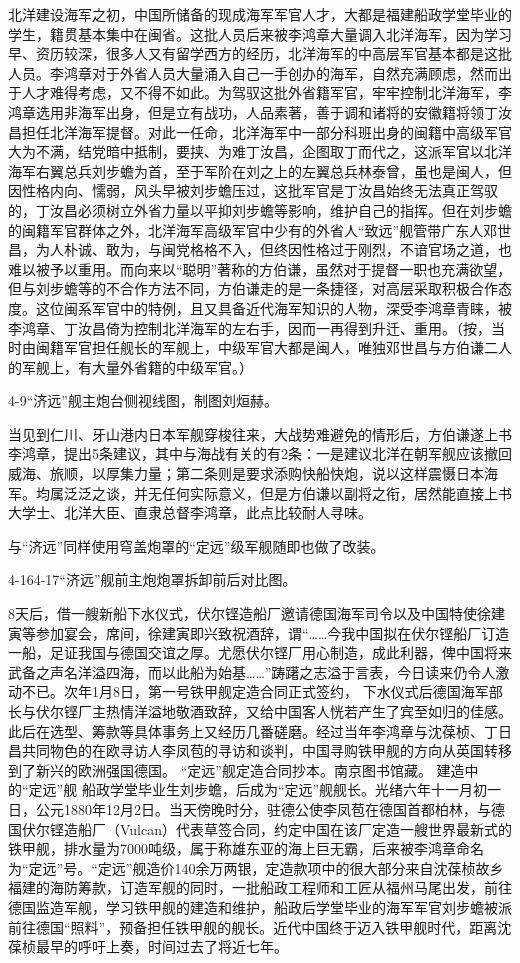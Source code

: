 \documentclass[12pt,UTF8]{ctexbook}
\begin{document}
北洋建设海军之初，中国所储备的现成海军军官人才，大都是福建船政学堂毕业的学生，籍贯基本集中在闽省。这批人员后来被李鸿章大量调入北洋海军，因为学习早、资历较深，很多人又有留学西方的经历，北洋海军的中高层军官基本都是这批人员。李鸿章对于外省人员大量涌入自己一手创办的海军，自然充满顾虑，然而出于人才难得考虑，又不得不如此。为驾驭这批外省籍军官，牢牢控制北洋海军，李鸿章选用非海军出身，但是立有战功，人品素著，善于调和诸将的安徽籍将领丁汝昌担任北洋海军提督。对此一任命，北洋海军中一部分科班出身的闽籍中高级军官大为不满，结党暗中抵制，要挟、为难丁汝昌，企图取丁而代之，这派军官以北洋海军右翼总兵刘步蟾为首，至于军阶在刘之上的左翼总兵林泰曾，虽也是闽人，但因性格内向、懦弱，风头早被刘步蟾压过，这批军官是丁汝昌始终无法真正驾驭的，丁汝昌必须树立外省力量以平抑刘步蟾等影响，维护自己的指挥。但在刘步蟾的闽籍军官群体之外，北洋海军高级军官中少有的外省人“致远”舰管带广东人邓世昌，为人朴诚、敢为，与闽党格格不入，但终因性格过于刚烈，不谙官场之道，也难以被予以重用。而向来以“聪明”著称的方伯谦，虽然对于提督一职也充满欲望，但与刘步蟾等的不合作方法不同，方伯谦走的是一条捷径，对高层采取积极合作态度。这位闽系军官中的特例，且又具备近代海军知识的人物，深受李鸿章青睐，被李鸿章、丁汝昌倚为控制北洋海军的左右手，因而一再得到升迁、重用。（按，当时由闽籍军官担任舰长的军舰上，中级军官大都是闽人，唯独邓世昌与方伯谦二人的军舰上，有大量外省籍的中级军官。）

4-9“济远”舰主炮台侧视线图，制图刘烜赫。

当见到仁川、牙山港内日本军舰穿梭往来，大战势难避免的情形后，方伯谦遂上书李鸿章，提出5条建议，其中与海战有关的有2条：一是建议北洋在朝军舰应该撤回威海、旅顺，以厚集力量；第二条则是要求添购快船快炮，说以这样震慑日本海军。均属泛泛之谈，并无任何实际意义，但是方伯谦以副将之衔，居然能直接上书大学士、北洋大臣、直隶总督李鸿章，此点比较耐人寻味。

与“济远”同样使用穹盖炮罩的“定远”级军舰随即也做了改装。

4-164-17“济远”舰前主炮炮罩拆卸前后对比图。

8天后，借一艘新船下水仪式，伏尔铿造船厂邀请德国海军司令以及中国特使徐建寅等参加宴会，席间，徐建寅即兴致祝酒辞，谓“……今我中国拟在伏尔铿船厂订造一船，足证我国与德国交谊之厚。尤愿伏尔铿厂用心制造，成此利器，俾中国将来武备之声名洋溢四海，而以此船为始基……”踌躇之志溢于言表，今日读来仍令人激动不已。次年1月8日，第一号铁甲舰定造合同正式签约，
下水仪式后德国海军部长与伏尔铿厂主热情洋溢地敬酒致辞，又给中国客人恍若产生了宾至如归的佳感。此后在选型、筹款等具体事务上又经历几番磋磨。经过当年李鸿章与沈葆桢、丁日昌共同物色的在欧寻访人李凤苞的寻访和谈判，中国寻购铁甲舰的方向从英国转移到了新兴的欧洲强国德国。
“定远”舰定造合同抄本。南京图书馆藏。
建造中的“定远”舰
船政学堂毕业生刘步蟾，后成为“定远”舰舰长。光绪六年十一月初一日，公元1880年12月2日。当天傍晚时分，驻德公使李凤苞在德国首都柏林，与德国伏尔铿造船厂（Vulcan）代表草签合同，约定中国在该厂定造一艘世界最新式的铁甲舰，排水量为7000吨级，属于称雄东亚的海上巨无霸，后来被李鸿章命名为“定远”号。“定远”舰造价140余万两银，定造款项中的很大部分来自沈葆桢故乡福建的海防筹款，订造军舰的同时，一批船政工程师和工匠从福州马尾出发，前往德国监造军舰，学习铁甲舰的建造和维护，船政后学堂毕业的海军军官刘步蟾被派前往德国“照料”，预备担任铁甲舰的舰长。近代中国终于迈入铁甲舰时代，距离沈葆桢最早的呼吁上奏，时间过去了将近七年。
\end{document}
